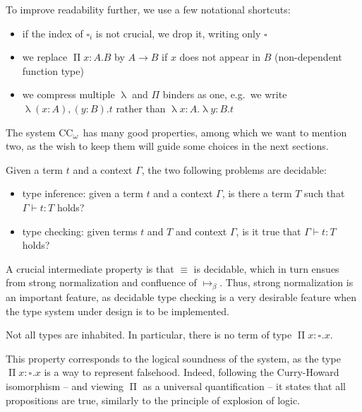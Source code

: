 \documentclass[en]{myarticle}
\newcommand{\uni}[1][]{\square_{#1}}
\newcommand{\conv}{\equiv}
\newcommand{\red}{\mapsto}
\newcommand{\bred}{\red_\beta}
\renewcommand{\P}{\operatorname{\Pi}}
\DeclareMathOperator{\?}{?}
\renewcommand{\l}{\operatorname{\lambda}}
\newcommand{\coc}{CC\textsubscript{$\omega$}}
\begin{document}
{


To improve readability further, we use a few notational shortcuts:
\begin{itemize}
	\item if the index of $\uni[i]$ is not crucial, we drop it, writing only $\uni$
	\item we replace $ \P x : A . B$ by $A \to B$ if $x$ does not appear in $B$ (non-dependent function type)
	\item we compress multiple $\l$ and $\Pi$ binders as one, e.g.\ we write $\l (x : A),(y : B) . t$ rather than $\l x : A . \l y : B . t$
\end{itemize}

The system \coc\ has many good properties, among which we want to mention two, as the wish to keep them will guide some choices in the next sections.

\begin{prop}
	Given a term $t$ and a context $\Gamma$, the two following problems are decidable:
	\begin{itemize}
		\item type inference: given a term $t$ and a context $\Gamma$, is there a term $T$ such that $\Gamma \vdash t : T$ holds?
		\item type checking: given terms $t$ and $T$ and context $\Gamma$, is it true that $\Gamma \vdash t : T$ holds?
	\end{itemize}
\end{prop}

 A crucial intermediate property is that $\conv$ is decidable, which in turn ensues from strong normalization and confluence of $\bred$. Thus, strong normalization is an important feature, as decidable type checking is a very desirable feature when the type system under design is to be implemented.
 
\begin{prop}[Consistency]
	Not all types are inhabited. In particular, there is no term of type $ \P x : \uni . x$.
\end{prop}

This property corresponds to the logical soundness of the system, as the type $ \P x : \uni . x$ is a way to represent falsehood. Indeed, following the Curry-Howard isomorphism – and viewing $\P$ as a universal quantification – it states that all propositions are true, similarly to the principle of explosion of logic.


}
\end{document}
